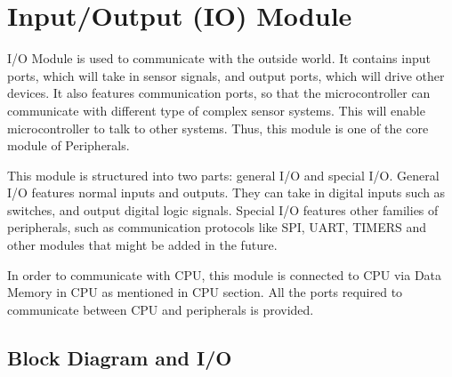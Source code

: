 \section{Input/Output (IO) Module}
I/O Module is used to communicate with the outside world.
It contains input ports, which will take in sensor signals, and output ports, which will drive other devices.
It also features communication ports, so that the microcontroller can communicate with different type of complex sensor systems.
This will enable microcontroller to talk to other systems.
Thus, this module is one of the core module of Peripherals.

This module is structured into two parts: general I/O and special I/O.
General I/O features normal inputs and outputs. They can take in digital inputs such as switches, and output digital logic signals.
Special I/O features other families of peripherals, such as communication protocols like SPI, UART, TIMERS and other modules that might be added
in the future.

In order to communicate with CPU, this module is connected to CPU via Data Memory in CPU as mentioned in CPU section.
All the ports required to communicate between CPU and peripherals is provided.


\subsection{Block Diagram and I/O}

